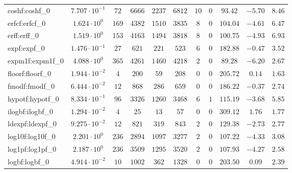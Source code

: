 \begin{tabular}{|l|c|c|c|c|c|c|c|c|c|c|}
coshf:coshf\_0               & $ 7.707 \cdot 10^{-1} $ & $ 72     $ & $ 6666   $ & $ 2237  $ & $ 6812   $ & $ 10  $ & $ 0 $ & $ 93.42       $ & $ -5.70   $ & $ 8.46    $ \\
erfcf:erfcf\_0               & $ 1.624 \cdot 10^{0}  $ & $ 169    $ & $ 4382   $ & $ 1510  $ & $ 3835   $ & $ 8   $ & $ 0 $ & $ 104.04      $ & $ -4.61   $ & $ 6.47    $ \\
erff:erff\_0                 & $ 1.519 \cdot 10^{0}  $ & $ 153    $ & $ 4163   $ & $ 1494  $ & $ 3818   $ & $ 8   $ & $ 0 $ & $ 100.75      $ & $ -4.93   $ & $ 6.93    $ \\
expf:expf\_0                 & $ 1.476 \cdot 10^{-1} $ & $ 27     $ & $ 621    $ & $ 221   $ & $ 523    $ & $ 6   $ & $ 0 $ & $ 182.88      $ & $ -0.47   $ & $ 3.52    $ \\
expm1f:expm1f\_0             & $ 4.088 \cdot 10^{0}  $ & $ 365    $ & $ 4261   $ & $ 1460  $ & $ 4218   $ & $ 2   $ & $ 0 $ & $ 89.28       $ & $ -6.20   $ & $ 2.67    $ \\
floorf:floorf\_0             & $ 1.944 \cdot 10^{-2} $ & $ 4      $ & $ 200    $ & $ 59    $ & $ 208    $ & $ 0   $ & $ 0 $ & $ 205.72      $ & $ 0.14    $ & $ 1.63    $ \\
fmodf:fmodf\_0               & $ 6.444 \cdot 10^{-2} $ & $ 12     $ & $ 868    $ & $ 286   $ & $ 659    $ & $ 0   $ & $ 0 $ & $ 186.22      $ & $ -0.37   $ & $ 2.74    $ \\
hypotf:hypotf\_0             & $ 8.334 \cdot 10^{-1} $ & $ 96     $ & $ 3326   $ & $ 1260  $ & $ 3468   $ & $ 6   $ & $ 1 $ & $ 115.19      $ & $ -3.68   $ & $ 5.85    $ \\
ilogbf:ilogbf\_0             & $ 1.294 \cdot 10^{-2} $ & $ 4      $ & $ 25     $ & $ 13    $ & $ 57     $ & $ 0   $ & $ 0 $ & $ 309.12      $ & $ 1.76    $ & $ 1.77    $ \\
ldexpf:ldexpf\_0             & $ 9.275 \cdot 10^{-2} $ & $ 12     $ & $ 821    $ & $ 319   $ & $ 843    $ & $ 2   $ & $ 0 $ & $ 129.38      $ & $ -2.73   $ & $ 2.77    $ \\
log10f:log10f\_0             & $ 2.201 \cdot 10^{0}  $ & $ 236    $ & $ 2894   $ & $ 1097  $ & $ 3277   $ & $ 2   $ & $ 0 $ & $ 107.22      $ & $ -4.33   $ & $ 3.08    $ \\
log1pf:log1pf\_0             & $ 2.187 \cdot 10^{0}  $ & $ 236    $ & $ 3509   $ & $ 1295  $ & $ 3520   $ & $ 2   $ & $ 0 $ & $ 107.93      $ & $ -4.27   $ & $ 2.58    $ \\
logbf:logbf\_0               & $ 4.914 \cdot 10^{-2} $ & $ 10     $ & $ 1002   $ & $ 362   $ & $ 1328   $ & $ 0   $ & $ 0 $ & $ 203.50      $ & $ 0.09    $ & $ 2.39    $ \\

\end{tabular}
